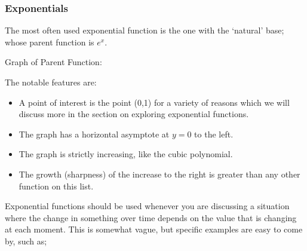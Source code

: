 \documentclass{ximera}
\begin{document}
    
    
    
    
    \subsubsection*{Exponentials}
    
        \begin{description}
            \item[Parent Function:] The most often used exponential function is the one with the `natural' base; whose parent function is $e^x$.\\
            \begin{minipage}{\textwidth}\item[Graph of Parent Function:]\hspace*{0pt} \\
                \begin{center}
                \end{center}
            \end{minipage}
            \item[Notable Features of Graph:] The notable features are:
            \begin{itemize}
                \item A point of interest is the point (0,1) for a variety of reasons which we will discuss more in the section on exploring exponential functions.
                \item The graph has a horizontal asymptote at $y=0$ to the left.
                \item The graph is strictly increasing, like the cubic polynomial.
                \item The growth (sharpness) of the increase to the right is greater than any other function on this list.
            \end{itemize}
            \item[Example usage:] Exponential functions should be used whenever you are discussing a situation where the change in something over time depends on the value that is changing at each moment. This is somewhat vague, but specific examples are easy to come by, such as;

\end{description}
\end{document}
